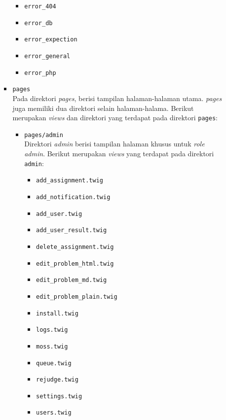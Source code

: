 \documentclass[a4paper,twoside]{article}
\begin{document}
\begin{enumerate}
\begin{itemize}
\begin{itemize}
			                  \begin{itemize}
				                  \item \verb|error_404|
				                  \item \verb|error_db|
				                  \item \verb|error_expection|
				                  \item \verb|error_general|
				                  \item \verb|error_php|
			                  \end{itemize}

			            \item \verb|pages| \\
			                  Pada direktori \textit{pages}, berisi tampilan halaman-halaman utama. \textit{pages} juga memiliki dua direktori selain halaman-halama. Berikut merupakan \textit{views} dan direktori yang terdapat pada direktori \verb|pages|:

			                  \begin{itemize}
				                  \item \verb|pages/admin| \\
				                        Direktori \textit{admin} berisi tampilan halaman khusus untuk \textit{role admin}. Berikut merupakan \textit{views} yang terdapat pada direktori \verb|admin|:

				                        \begin{itemize}
					                        \item \verb|add_assignment.twig|
					                        \item \verb|add_notification.twig|
					                        \item \verb|add_user.twig|
					                        \item \verb|add_user_result.twig|
					                        \item \verb|delete_assignment.twig|
					                        \item \verb|edit_problem_html.twig|
					                        \item \verb|edit_problem_md.twig|
					                        \item \verb|edit_problem_plain.twig|
					                        \item \verb|install.twig|
					                        \item \verb|logs.twig|
					                        \item \verb|moss.twig|
					                        \item \verb|queue.twig|
					                        \item \verb|rejudge.twig|
					                        \item \verb|settings.twig|
					                        \item \verb|users.twig|
				                        \end{itemize}


\end{itemize}
\end{itemize}
\end{itemize}
\end{enumerate}
\end{document}
